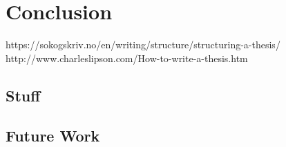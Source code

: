 %
\chapter{Conclusion}
\label{sec:conclusion}


https://sokogskriv.no/en/writing/structure/structuring-a-thesis/
http://www.charleslipson.com/How-to-write-a-thesis.htm

\section{Stuff}
\label{sec:conclusion:sec1}


\section{Future Work}
\label{sec:conclusion:future}

